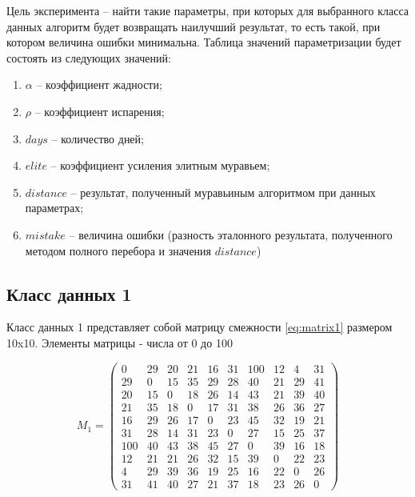 Цель эксперимента -- найти такие параметры, при которых для выбранного класса данных алгоритм будет возвращать наилучший результат, то есть такой, при котором величина ошибки минимальна.
Таблица значений параметризации будет состоять из следующих значений:

\begin{enumerate}
    \item $\alpha$ -- коэффициент жадности;
    \item $\rho$ -- коэффициент испарения;
    \item $days$ -- количество дней;
    \item $elite$ -- коэффициент усиления элитным муравьем;
    \item $distance$ -- результат, полученный муравьиным алгоритмом при данных параметрах;
    \item $mistake$ -- величина ошибки (разность эталонного результата, полученного методом полного перебора и значения $distance$)
\end{enumerate}

\subsection{Класс данных 1}

Класс данных 1 представляет собой матрицу смежности \ref{eq:matrix1} размером 10x10.
Элементы матрицы - числа от 0 до 100

\begin{equation}
	\label{eq:matrix1}
	M_{1} = \begin{pmatrix}
        0 & 29 & 20 & 21 & 16 & 31 & 100 & 12 & 4 & 31 \\
        29 & 0 & 15 & 35 & 29 & 28 & 40 & 21 & 29 & 41 \\
        20 & 15 & 0 & 18 & 26 & 14 & 43 & 21 & 39 & 40 \\
        21 & 35 & 18 & 0 & 17 & 31 & 38 & 26 & 36 & 27 \\
        16 & 29 & 26 & 17 & 0 & 23 & 45 & 32 & 19 & 21 \\
        31 & 28 & 14 & 31 & 23 & 0 & 27 & 15 & 25 & 37 \\
        100 & 40 & 43 & 38 & 45 & 27 & 0 & 39 & 16 & 18 \\
        12 & 21 & 21 & 26 & 32 & 15 & 39 & 0 & 22 & 23 \\
        4 & 29 & 39 & 36 & 19 & 25 & 16 & 22 & 0 & 26 \\
        31 & 41 & 40 & 27 & 21 & 37 & 18 & 23 & 26 & 0
	\end{pmatrix}
\end{equation}

